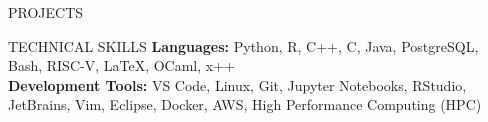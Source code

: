 \documentclass{resume} %
\begin{document}
\begin{rSection}{PROJECTS}

 
 
\end{rSection} 
\vspace{-6pt}
\begin{rSection}{TECHNICAL SKILLS}
\textbf{Languages:} Python, R, C++, C, Java, PostgreSQL, Bash, RISC-V, LaTeX, OCaml, x++\\
\textbf{Development Tools:} VS Code, Linux, Git, Jupyter Notebooks, RStudio, JetBrains, Vim, Eclipse, Docker, AWS, High Performance Computing (HPC)
\end{rSection}
\end{document}
